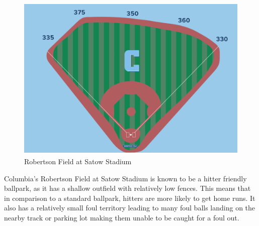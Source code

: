 \documentclass{article}
\begin{document}
\vspace{1cm}
\begin{figure}[h]
    \centering        
    \includegraphics[height=8cm]{images/columbia_field.png}
    \caption{Robertson Field at Satow Stadium}
\end{figure}
\vspace{1cm}

Columbia's Robertson Field at Satow Stadium is known to be a hitter friendly ballpark, as it has a shallow outfield with relatively low fences. This means that in comparison to a standard ballpark, hitters are more likely to get home runs. It also has a relatively small foul territory leading to many foul balls landing on the nearby track or parking lot making them unable to be caught for a foul out.  \cite{columbialions2022baseball} \cite{columbialions2023baseball} \cite{columbialions2024baseball}
\end{document}
